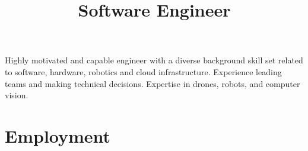 \documentclass[11pt,a4paper,sans]{moderncv}        %
\title{Software Engineer}                               %
\begin{document}
\makecvtitle

\small{Highly motivated and capable engineer with a diverse background skill set related to software, hardware, robotics and cloud infrastructure. Experience leading teams and making technical decisions. Expertise in drones, robots, and computer vision. }

\section{Employment}

\vspace{1pt}
\end{document}
